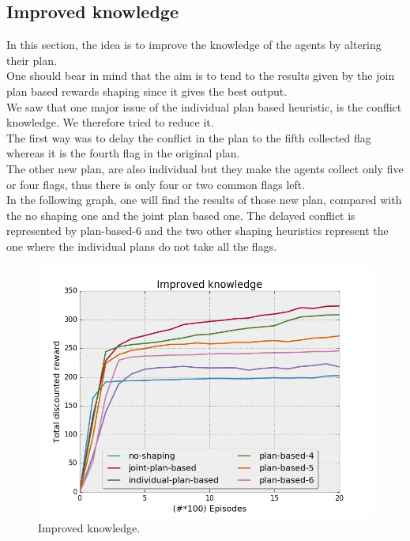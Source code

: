 \documentclass[letterpaper]{article}
\begin{document}
\subsection{Improved knowledge}

In this section, the idea is to improve the knowledge of the agents by altering their plan.\\
One should bear in mind that the aim is to tend to the results given by the join plan based rewards shaping since it gives the best output.\\
We saw that one major issue of the individual plan based heuristic, is the conflict knowledge. We therefore tried to reduce it.\\
The first way was to delay the conflict in the plan to the fifth collected flag whereas it is the fourth flag in the original plan.\\
The other new plan, are also individual but they make the agents collect only five or four flags, thus there is only four or two common flags left.\\
In the following graph, one will find the results of those new plan, compared with the no shaping one and the joint plan based one. The delayed conflict is represented by plan-based-6 and the two other shaping heuristics represent the one where the individual plans do not take all the flags.

\begin{figure}[h!]
  \includegraphics[width=\linewidth]{img/knowledge.png}
  \caption{Improved knowledge.}
  \label{fig:results2}
\end{figure}
\end{document}
